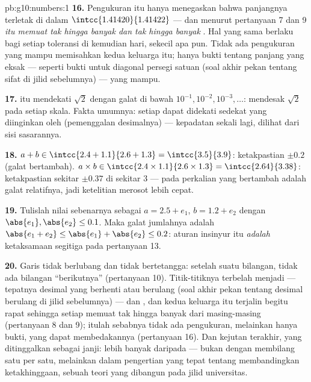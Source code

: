 \begin{solution}{pb:g10:numbers:1}
\textbf{16.} Pengukuran itu hanya menegaskan bahwa panjangnya terletak
di dalam  $\intcc{1.41420}{1.41422}$ --- dan menurut pertanyaan
7 dan 9 \emph{ itu memuat tak hingga banyak 
dan tak hingga banyak }. Hal yang sama berlaku bagi
setiap toleransi di kemudian hari, sekecil apa pun. Tidak ada pengukuran
yang mampu memisahkan kedua keluarga itu; hanya bukti tentang panjang
yang eksak --- seperti bukti untuk diagonal persegi satuan (soal akhir
pekan tentang sifat  di jilid sebelumnya) --- yang mampu.

\textbf{17.}  itu mendekati $\sqrt2$ dengan galat di bawah
$10^{-1}, 10^{-2}, 10^{-3}, \dots$:  mendesak
$\sqrt2$ pada setiap skala. Fakta umumnya: setiap  dapat
didekati sedekat yang diinginkan oleh  (pemenggalan
desimalnya) --- kepadatan sekali lagi, dilihat dari sisi sasarannya.

\textbf{18.} $a + b \in \intcc{2.4 + 1.1}{2.6 + 1.3} =
\intcc{3.5}{3.9}$: ketakpastian $\pm 0.2$ (galat bertambah).
$a \times b \in \intcc{2.4 \times 1.1}{2.6 \times 1.3} =
\intcc{2.64}{3.38}$: ketakpastian sekitar $\pm 0.37$ di sekitar
$3$ --- pada perkalian yang bertambah adalah galat relatifnya, jadi
ketelitian merosot lebih cepat.

\textbf{19.} Tulislah nilai sebenarnya sebagai $a = 2.5 + e_1$,
$b = 1.2 + e_2$ dengan $\abs{e_1}, \abs{e_2} \leq 0.1$. Maka
galat jumlahnya adalah $\abs{e_1 + e_2} \leq \abs{e_1} +
\abs{e_2} \leq 0.2$: aturan insinyur itu \emph{adalah} ketaksamaan
segitiga pada pertanyaan 13.

\textbf{20.} Garis  tidak berlubang dan tidak bertetangga:
setelah suatu bilangan, tidak ada bilangan ``berikutnya'' (pertanyaan
10). Titik-titiknya terbelah menjadi  --- tepatnya
desimal yang berhenti atau berulang (soal akhir pekan tentang desimal
berulang di jilid sebelumnya) --- dan , dan kedua
keluarga itu terjalin begitu rapat sehingga setiap  memuat tak
hingga banyak dari masing-masing (pertanyaan 8 dan 9); itulah sebabnya
tidak ada pengukuran, melainkan hanya bukti, yang dapat membedakannya
(pertanyaan 16). Dan kejutan terakhir, yang ditinggalkan sebagai janji:
 lebih banyak daripada  --- bukan
dengan membilang satu per satu, melainkan dalam pengertian yang tepat
tentang membandingkan ketakhinggaan, sebuah teori yang dibangun pada
jilid universitas.

\end{solution}
